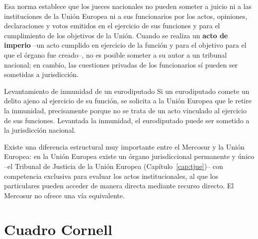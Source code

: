 \documentclass[12pt,oneside]{book}
\begin{document}
Esa norma establece que los jueces nacionales no pueden someter a juicio ni a las instituciones de la Unión Europea ni a sus funcionarios por los actos, opiniones, declaraciones y votos emitidos en el ejercicio de sus funciones y para el cumplimiento de los objetivos de la Unión. Cuando se realiza un \textbf{acto de imperio} --un acto cumplido en ejercicio de la función y para el objetivo para el que el órgano fue creado--, no es posible someter a su autor a un tribunal nacional; en cambio, las cuestiones privadas de los funcionarios sí pueden ser sometidas a jurisdicción.

\begin{ejemplo}{Levantamiento de inmunidad de un eurodiputado}
Si un eurodiputado comete un delito ajeno al ejercicio de su función, se solicita a la Unión Europea que le retire la inmunidad, precisamente porque no se trata de un acto vinculado al ejercicio de sus funciones. Levantada la inmunidad, el eurodiputado puede ser sometido a la jurisdicción nacional.
\end{ejemplo}

\begin{importante}
Existe una diferencia estructural muy importante entre el Mercosur y la Unión Europea: en la Unión Europea existe un órgano jurisdiccional permanente y único --el Tribunal de Justicia de la Unión Europea (Capítulo~\ref{cap:tjue})-- con competencia exclusiva para evaluar los actos institucionales, al que los particulares pueden acceder de manera directa mediante recurso directo. El Mercosur no ofrece una vía equivalente.
\end{importante}

\section{Cuadro Cornell}
\end{document}
